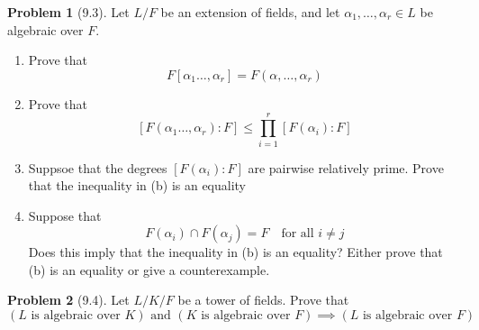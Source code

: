 \documentclass[12pt]{article}
\theoremstyle{definition}
\newtheorem{problem}{Problem}
\begin{document}
\begin{problem}[9.3]
    Let $L/F$ be an extension of fields, and let $\alpha_1, \ldots, \alpha_r \in L$ be algebraic over $F$.
    \begin{enumerate}[label=(\alph*)]
        \item Prove that 
              \[
                    F[\alpha_1 \ldots, \alpha_r] = F(\alpha, \ldots, \alpha_r)
              \]
        \begin{solution}

        \end{solution}

        \item Prove that 
              \[ 
                  [F(\alpha_1 \ldots, \alpha_r) : F] \leq \prod_{i=1}^{r}[F(\alpha_i) : F] 
              \]
        \begin{solution}

        \end{solution}

        \item Suppsoe that the degrees $[F(\alpha_i) : F]$ are pairwise relatively prime. Prove that the inequality in (b) is an equality
        \begin{solution}

        \end{solution}

        \item Suppose that
        \[
            F(\alpha_i) \cap F(\alpha_j) = F \quad \text{for all } i\neq j
        \]
        Does this imply that the inequality in (b) is an equality? Either prove that (b) is an equality or give a counterexample. 
        
        \begin{solution}

        \end{solution}
    \end{enumerate}
\end{problem}

\begin{problem}[9.4]
    Let $L/K/F$ be a tower of fields. Prove that
    \[
        (L \text{ is algebraic over } K) \text{ and } (K \text{ is algebraic over } F) \implies (L \text{ is algebraic over } F)
    \]
    \begin{solution}

    \end{solution}
\end{problem}
\end{document}

